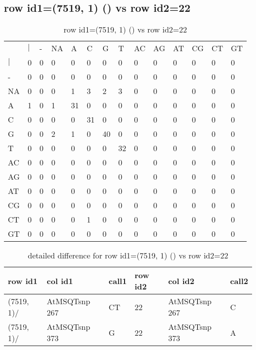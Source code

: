 \subsection{row id1=(7519, 1) () vs row id2=22}
\begin{center}
\begin{longtable}{|l|l|l|l|l|l|l|l|l|l|l|l|l|l|}
\caption{row id1=(7519, 1) () vs row id2=22} \label{table_dm326}\\
\hline
\\
\hline
&$|$&-&NA&A&C&G&T&AC&AG&AT&CG&CT&GT\\
$|$&0&0&0&0&0&0&0&0&0&0&0&0&0\\
-&0&0&0&0&0&0&0&0&0&0&0&0&0\\
NA&0&0&0&1&3&2&3&0&0&0&0&0&0\\
A&1&0&1&31&0&0&0&0&0&0&0&0&0\\
C&0&0&0&0&31&0&0&0&0&0&0&0&0\\
G&0&0&2&1&0&40&0&0&0&0&0&0&0\\
T&0&0&0&0&0&0&32&0&0&0&0&0&0\\
AC&0&0&0&0&0&0&0&0&0&0&0&0&0\\
AG&0&0&0&0&0&0&0&0&0&0&0&0&0\\
AT&0&0&0&0&0&0&0&0&0&0&0&0&0\\
CG&0&0&0&0&0&0&0&0&0&0&0&0&0\\
CT&0&0&0&0&1&0&0&0&0&0&0&0&0\\
GT&0&0&0&0&0&0&0&0&0&0&0&0&0\\
\hline
\end{longtable}
\end{center}

\begin{center}
\begin{longtable}{|l|l|l|l|l|l|}
\caption{detailed difference for row id1=(7519, 1) () vs row id2=22} \label{table_dm327}\\
\hline
row id1&col id1&call1&row id2&col id2&call2\\
\hline
(7519, 1)/&AtMSQTsnp 267&CT&22&AtMSQTsnp 267&C\\
(7519, 1)/&AtMSQTsnp 373&G&22&AtMSQTsnp 373&A\\
\hline
\end{longtable}
\end{center}


